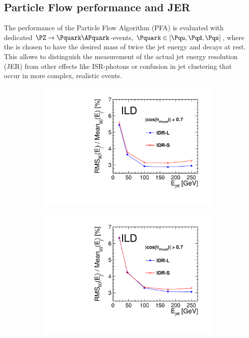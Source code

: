 \subsection{Particle Flow performance and JER}
The performance of the Particle Flow Algorithm (PFA) is evaluated with dedicated  $\PZ\rightarrow \Pquark\APquark$-events, $\Pquark \in [\Pqu,\Pqd,\Pqs]$,
where the \PZ is chosen to have the desired mass of twice the jet energy and decays at rest. This allows to distinguish the measurement of the
actual jet energy resolution (JER) from other effects like ISR-photons or confusion in jet clustering that occur in more complex,
realistic events.
%
% 
\begin{figure}[htbp]
\begin{subfigure}{0.49\hsize}
 \includegraphics[width=\hsize]{Performance/fig/JERs_uds_l5_vs_s5_Barrel.pdf}
 \caption{ \label{fig:perf:pfa_jer}}
 \end{subfigure}
\begin{subfigure}{0.49\hsize}
 \includegraphics[width=\hsize]{Performance/fig/JERs_uds_l5_vs_s5_Endcap.pdf}

\end{subfigure}
\end{figure}
